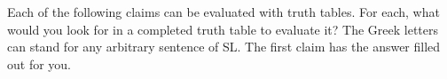 





\iffalse

\practiceproblems



\problempart
\label{HW3.C}
Each of the following claims can be evaluated with truth tables. For each, what would you look for in a completed truth table to evaluate it? The Greek letters can stand for any arbitrary sentence of SL. The first claim has the answer filled out for you.

